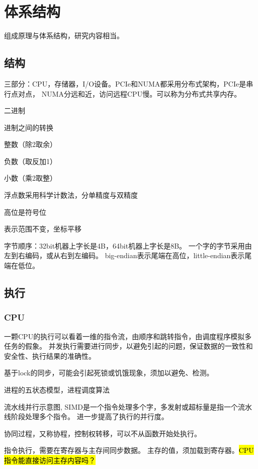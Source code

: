 \chapter{体系结构}

组成原理与体系结构，研究内容相当。

\section{结构}

三部分：CPU，存储器，I/O设备。PCIe和NUMA都采用分布式架构，PCIe是串行点对点，
NUMA分远和近，访问远程CPU慢。可以称为分布式共享内存。

二进制

进制之间的转换
\begin{enumbox}
\item 整数（除2取余）
\item 负数（取反加1）
\item 小数（乘2取整）
\item 浮点数采用科学计数法，分单精度与双精度
\item 高位是符号位
\item 表示范围不变，坐标平移
\end{enumbox}

字节顺序：32bit机器上字长是4B，64bit机器上字长是8B。
一个字的字节采用由左到右编码，或从右到左编码。
big-endian表示尾端在高位，little-endian表示尾端在低位。

\section{执行}

\subsection{CPU}

一颗CPU的执行可以看着一维的指令流，由顺序和跳转指令，由调度程序模拟多任务的假象。
并发执行需要进行同步，以避免引起的问题，保证数据的一致性和安全性、执行结果的准确性。

基于lock的同步，可能会引起死锁或饥饿现象，须加以避免、检测。

进程的五状态模型，进程调度算法

流水线并行示意图, SIMD是一个指令处理多个字，多发射或超标量是指一个流水线阶段处理多个指令。
进一步提高了执行的并行度。

协同过程，又称协程，控制权转移，可以不从函数开始处执行。

指令执行，需要在寄存器与主存间同步数据。
主存的值，须加载到寄存器。\hl{CPU指令能直接访问主存内容吗？}

